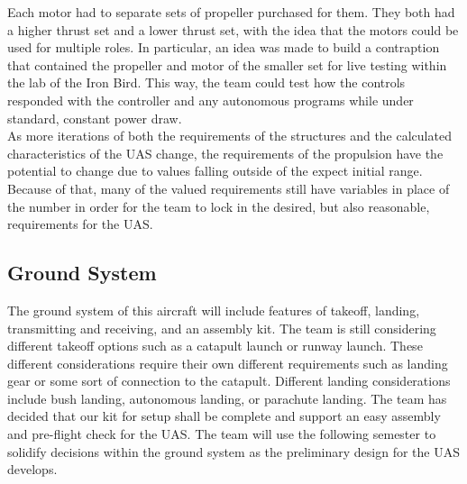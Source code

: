 \documentclass{article}
\begin{document}
\noindent Each motor had to separate sets of propeller purchased for them. They both had a higher thrust set and a lower thrust set, with the idea that the motors could be used for multiple roles. In particular, an idea was made to build a contraption that contained the propeller and motor of the smaller set for live testing within the lab of the Iron Bird. This way, the team could test how the controls responded with the controller and any autonomous programs while under standard, constant power draw. \\

\noindent As more iterations of both the requirements of the structures and the calculated characteristics of the UAS change, the requirements of the propulsion have the potential to change due to values falling outside of the expect initial range. Because of that, many of the valued requirements still have variables in place of the number in order for the team to lock in the desired, but also reasonable, requirements for the UAS. \\

\subsection{Ground System}
\noindent The ground system of this aircraft will include features of takeoff, landing, transmitting and receiving, and an assembly kit. The team is still considering different takeoff options such as a catapult launch or runway launch. These different considerations require their own different requirements such as landing gear or some sort of connection to the catapult. Different landing considerations include bush landing, autonomous landing, or parachute landing. The team has decided that our kit for setup shall be complete and support an easy assembly and pre-flight check for the UAS. The team will use the following semester to solidify decisions within the ground system as the preliminary design for the UAS develops. \\

\end{document}
